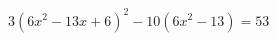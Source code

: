 \begin{ex}[type=equation]
	\begin{condition}
		\( 3(6x^2-13x+6)^2-10(6x^2-13)=53 \)
	\end{condition}
\end{ex}